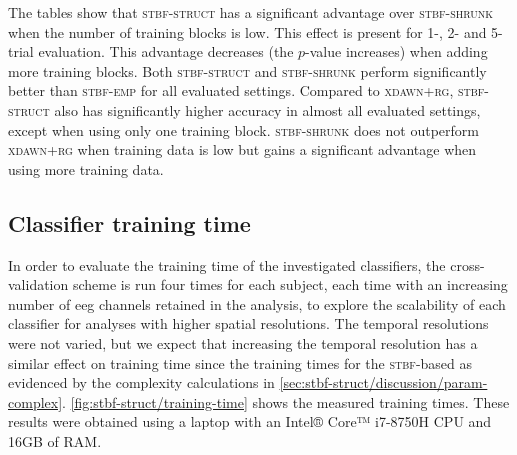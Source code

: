   \begin{table}[p]
		\centering
    \makebox[\textwidth][c]{%
		
  }
    \caption[Statistical significance of differences in classifier performance (1 repetition).]{%
      Statistical significance of differences in classifier performance.
      $p$-values calculated by one-sided paired Wilcoxon rank-sum test with
			Holm correction using one testing trial for different classifiers
			and levels of data availability. $p$-values $<0.05$ are considered significant
			and marked in grey.}
		\label{tab:stbf-struct/p-values-1}
    \bigskip

		\centering
    \makebox[\textwidth][c]{%
		
    }
		\caption[Statistical significance of differences in classifier performance (2 repetitions).]{%
      $p$-values as in \cref{tab:stbf-struct/p-values-1} averaging over two testing trials.}
		\label{tab:stbf-struct/p-values-2}
    \bigskip

		\centering
    \makebox[\textwidth][c]{%
		
    }
    \caption[Statistical significance of differences in classifier performance (5 repetitions).]{%
      $p$-values as in \cref{tab:stbf-struct/p-values-1} averaging over five testing trials.}
		\label{tab:stbf-struct/p-values-5}
	\end{table}
	\unskip

	The tables show that \textsc{stbf-struct} has a significant advantage over
	\textsc{stbf-shrunk} when the number of training blocks is low.
	This effect is present for 1-, 2- and 5-trial evaluation.
	This advantage decreases (the $p$-value increases) when
	adding more training blocks.
	Both \textsc{stbf-struct} and \textsc{stbf-shrunk} perform significantly better
	than \textsc{stbf-emp} for all evaluated settings.
	Compared to \textsc{xdawn+rg}, \textsc{stbf-struct} also has significantly
	higher accuracy in almost all evaluated settings, except when using only one training block.
	\textsc{stbf-shrunk} does not outperform \textsc{xdawn+rg} when training data is low but gains a significant advantage
	when using more training data.

	\subsection{Classifier training time}
	In order to evaluate the training time of the investigated classifiers, the
	cross-validation scheme is run four times for each subject, each time with an
	increasing number of \ac{eeg} channels retained in the analysis, to explore the scalability of each classifier for analyses with higher spatial resolutions.
	The temporal resolutions were not varied, but we expect that increasing the
	temporal resolution has a similar effect on training time since the
	training times for the \textsc{stbf}-based as evidenced by the complexity
	calculations in \cref{sec:stbf-struct/discussion/param-complex}.
	\cref{fig:stbf-struct/training-time} shows the measured training times.
	These results were obtained using a laptop with an Intel® Core™ i7-8750H CPU and 16GB of RAM.

